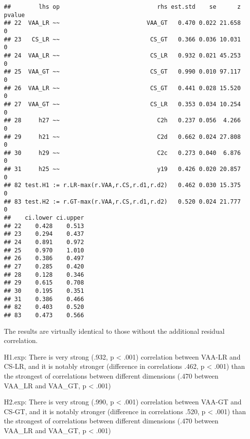 \documentclass[
]{article}
\newenvironment{Shaded}{\begin{snugshade}}{\end{snugshade}}
\newcommand{\CommentTok}[1]{\textcolor[rgb]{0.56,0.35,0.01}{\textit{#1}}}
\newcommand{\DecValTok}[1]{\textcolor[rgb]{0.00,0.00,0.81}{#1}}
\newcommand{\KeywordTok}[1]{\textcolor[rgb]{0.13,0.29,0.53}{\textbf{#1}}}
\newcommand{\NormalTok}[1]{#1}
\newcommand{\OperatorTok}[1]{\textcolor[rgb]{0.81,0.36,0.00}{\textbf{#1}}}
\newcommand{\StringTok}[1]{\textcolor[rgb]{0.31,0.60,0.02}{#1}}
\begin{document}
\begin{verbatim}
##        lhs op                            rhs est.std    se      z pvalue
## 22  VAA_LR ~~                         VAA_GT   0.470 0.022 21.658      0
## 23   CS_LR ~~                          CS_GT   0.366 0.036 10.031      0
## 24  VAA_LR ~~                          CS_LR   0.932 0.021 45.253      0
## 25  VAA_GT ~~                          CS_GT   0.990 0.010 97.117      0
## 26  VAA_LR ~~                          CS_GT   0.441 0.028 15.520      0
## 27  VAA_GT ~~                          CS_LR   0.353 0.034 10.254      0
## 28     h27 ~~                            C2h   0.237 0.056  4.266      0
## 29     h21 ~~                            C2d   0.662 0.024 27.808      0
## 30     h29 ~~                            C2c   0.273 0.040  6.876      0
## 31     h25 ~~                            y19   0.426 0.020 20.857      0
## 82 test.H1 := r.LR-max(r.VAA,r.CS,r.d1,r.d2)   0.462 0.030 15.375      0
## 83 test.H2 := r.GT-max(r.VAA,r.CS,r.d1,r.d2)   0.520 0.024 21.777      0
##    ci.lower ci.upper
## 22    0.428    0.513
## 23    0.294    0.437
## 24    0.891    0.972
## 25    0.970    1.010
## 26    0.386    0.497
## 27    0.285    0.420
## 28    0.128    0.346
## 29    0.615    0.708
## 30    0.195    0.351
## 31    0.386    0.466
## 82    0.403    0.520
## 83    0.473    0.566
\end{verbatim}

\begin{Shaded}
\end{Shaded}

The results are virtually identical to those without the additional
residual correlation.

H1.exp: There is very strong (.932, p \textless{} .001) correlation
between VAA-LR and CS-LR, and it is notably stronger (difference in
correlations .462, p \textless{} .001) than the strongest of
correlations between different dimensions (.470 between VAA\_LR and
VAA\_GT, p \textless{} .001)

H2.exp: There is very strong (.990, p \textless{} .001) correlation
between VAA-GT and CS-GT, and it is notably stronger (difference in
correlations .520, p \textless{} .001) than the strongest of
correlations between different dimensions (.470 between VAA\_LR and
VAA\_GT, p \textless{} .001)
\end{document}
